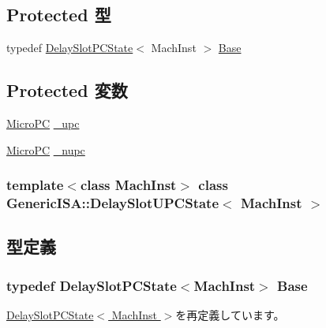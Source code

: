 \subsection*{Protected 型}
\begin{DoxyCompactItemize}
\item 
typedef \hyperlink{classGenericISA_1_1DelaySlotPCState}{DelaySlotPCState}$<$ MachInst $>$ \hyperlink{classGenericISA_1_1DelaySlotUPCState_a79462b82fdf9d7f85047aab294b849d8}{Base}
\end{DoxyCompactItemize}
\subsection*{Protected 変数}
\begin{DoxyCompactItemize}
\item 
\hyperlink{base_2types_8hh_adfb4d8b20c5abc8be73dd367b16f2d57}{MicroPC} \hyperlink{classGenericISA_1_1DelaySlotUPCState_ada1172c4155a1a9d7c37c92ca5326ba7}{\_\-upc}
\item 
\hyperlink{base_2types_8hh_adfb4d8b20c5abc8be73dd367b16f2d57}{MicroPC} \hyperlink{classGenericISA_1_1DelaySlotUPCState_ac04fdfa88334f532e3358ae2d9cff2cd}{\_\-nupc}
\end{DoxyCompactItemize}
\subsubsection*{template$<$class MachInst$>$ class GenericISA::DelaySlotUPCState$<$ MachInst $>$}



\subsection{型定義}
\hypertarget{classGenericISA_1_1DelaySlotUPCState_a79462b82fdf9d7f85047aab294b849d8}{
\subsubsection[{Base}]{\setlength{\rightskip}{0pt plus 5cm}typedef {\bf DelaySlotPCState}$<$MachInst$>$ {\bf Base}}}
\label{classGenericISA_1_1DelaySlotUPCState_a79462b82fdf9d7f85047aab294b849d8}


\hyperlink{classGenericISA_1_1DelaySlotPCState_a6d61e15302422cb743d88ee2ca4fd482}{DelaySlotPCState$<$ MachInst $>$}を再定義しています。

